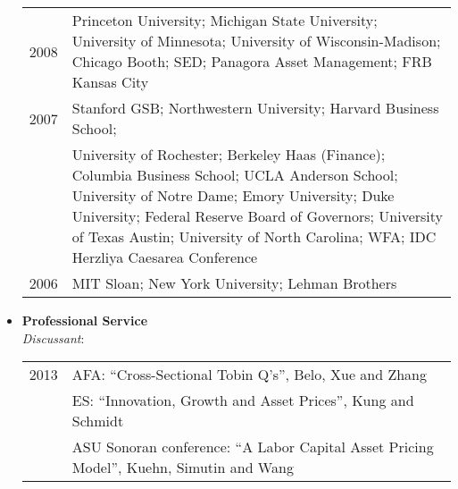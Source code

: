 \documentclass[11pt,a4paper,sans]{moderncv}
\begin{document}
\begin{resume}
\begin{itemize}
\begin{tabular}{lp{14cm}}
2008 & Princeton University; Michigan State University; University of Minnesota;    University of Wisconsin-Madison; Chicago Booth; SED;   Panagora Asset Management; FRB Kansas City\\[0.2cm]
2007 & Stanford GSB; Northwestern University; Harvard Business School; \\ &  University of Rochester; Berkeley Haas (Finance); Columbia Business School;  UCLA Anderson School; University of Notre Dame;    Emory University; Duke University; Federal Reserve Board of Governors;  University of Texas Austin; University of North Carolina;  WFA; IDC Herzliya Caesarea Conference\\[0.2cm]
2006 & MIT Sloan; New York University; Lehman Brothers\\
\end{tabular}
\vspace{0.5cm}
\item \textbf{Professional Service} \\

\emph{ Discussant}:\\

\begin{tabular}{lp{12cm}}
 2013 & AFA: ``Cross-Sectional Tobin Q's'', Belo,  Xue and   Zhang\\[0.2cm]
      &  ES: ``Innovation, Growth and Asset Prices'', Kung and Schmidt\\[0.2cm]
 & ASU Sonoran conference: ``A Labor Capital Asset Pricing Model'', Kuehn, Simutin and Wang \\[0.2cm]


\end{tabular}
\end{itemize}
\end{resume}
\end{document}

